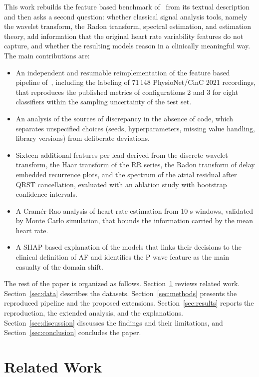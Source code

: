\documentclass[conference,a4paper]{IEEEtran}
\begin{document}
This work rebuilds the feature based benchmark of~\cite{nassar2025} from its textual description and then asks a second question: whether classical signal analysis tools, namely the wavelet transform, the Radon transform, spectral estimation, and estimation theory, add information that the original heart rate variability features do not capture, and whether the resulting models reason in a clinically meaningful way. The main contributions are:
\begin{itemize}
\item An independent and resumable reimplementation of the feature based pipeline of~\cite{nassar2025}, including the labeling of 71\,148 PhysioNet/CinC 2021 recordings, that reproduces the published metrics of configurations 2 and 3 for eight classifiers within the sampling uncertainty of the test set.
\item An analysis of the sources of discrepancy in the absence of code, which separates unspecified choices (seeds, hyperparameters, missing value handling, library versions) from deliberate deviations.
\item Sixteen additional features per lead derived from the discrete wavelet transform, the Haar transform of the RR series, the Radon transform of delay embedded recurrence plots, and the spectrum of the atrial residual after QRST cancellation, evaluated with an ablation study with bootstrap confidence intervals.
\item A Cramér Rao analysis of heart rate estimation from 10 s windows, validated by Monte Carlo simulation, that bounds the information carried by the mean heart rate.
\item A SHAP based explanation of the models that links their decisions to the clinical definition of AF and identifies the P wave feature as the main casualty of the domain shift.
\end{itemize}

The rest of the paper is organized as follows. Section~\ref{sec:related} reviews related work. Section~\ref{sec:data} describes the datasets. Section~\ref{sec:methods} presents the reproduced pipeline and the proposed extensions. Section~\ref{sec:results} reports the reproduction, the extended analysis, and the explanations. Section~\ref{sec:discussion} discusses the findings and their limitations, and Section~\ref{sec:conclusion} concludes the paper.

\section{Related Work}
\label{sec:related}
\end{document}
